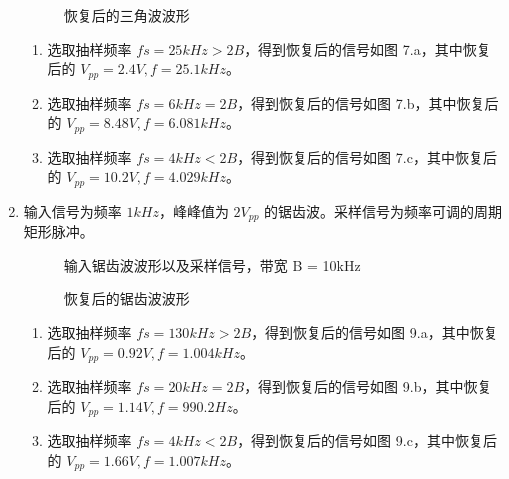 \documentclass[dvipsnames, svgnames,a4paper,11pt]{article}
\begin{document}
\begin{enumerate}
\begin{figure}[htbp]
        \caption{恢复后的三角波波形}
      \end{figure}

      \begin{enumerate}
        \item 选取抽样频率 $fs = 25kHz > 2B$，得到恢复后的信号如图 7.a，其中恢复后的 $V_{pp} = 2.4V,f = 25.1kHz$。
        \item 选取抽样频率 $fs = 6kHz = 2B$，得到恢复后的信号如图 7.b，其中恢复后的 $V_{pp} = 8.48V,f = 6.081kHz$。
        \item 选取抽样频率 $fs = 4kHz < 2B$，得到恢复后的信号如图 7.c，其中恢复后的 $V_{pp} = 10.2V,f = 4.029kHz$。
      \end{enumerate}
    
    \newpage
    \item 输入信号为频率 $1kHz$，峰峰值为 $2V_{pp}$ 的锯齿波。采样信号为频率可调的周期矩形脉冲。
      \begin{figure}[htbp]
        \centering
        \caption{输入锯齿波波形以及采样信号，带宽 B = 10kHz}
      \end{figure}
      \begin{figure}[htbp]
        \centering

        \caption{恢复后的锯齿波波形}
      \end{figure}

      \begin{enumerate}
        \item 选取抽样频率 $fs = 130kHz > 2B$，得到恢复后的信号如图 9.a，其中恢复后的 $V_{pp} = 0.92V,f = 1.004kHz$。
        \item 选取抽样频率 $fs = 20kHz = 2B$，得到恢复后的信号如图 9.b，其中恢复后的 $V_{pp} = 1.14V,f = 990.2Hz$。
        \item 选取抽样频率 $fs = 4kHz < 2B$，得到恢复后的信号如图 9.c，其中恢复后的 $V_{pp} = 1.66V,f = 1.007kHz$。
      \end{enumerate}

  \end{enumerate}
\end{document}
